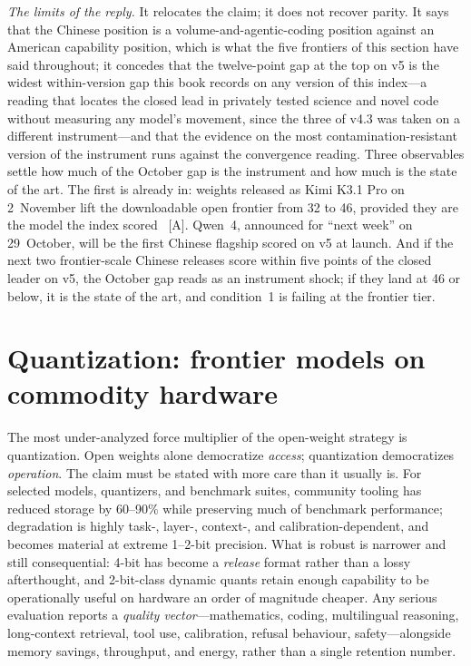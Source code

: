 \emph{The limits of the reply.} It relocates the claim; it does not recover parity. It says that the Chinese position is a volume-and-agentic-coding position against an American capability position, which is what the five frontiers of this section have said throughout; it concedes that the twelve-point gap at the top on v5 is the widest within-version gap this book records on any version of this index---a reading that locates the closed lead in privately tested science and novel code without measuring any model's movement, since the three of v4.3 was taken on a different instrument---and that the evidence on the most contamination-resistant version of the instrument runs against the convergence reading. Three observables settle how much of the October gap is the instrument and how much is the state of the art. The first is already in: weights released as Kimi K3.1 Pro on 2~November lift the downloadable open frontier from 32 to 46, provided they are the model the index scored~\cite{lit-k31-weights} [A]. Qwen~4, announced for ``next week'' on 29~October, will be the first Chinese flagship scored on v5 at launch. And if the next two frontier-scale Chinese releases score within five points of the closed leader on v5, the October gap reads as an instrument shock; if they land at 46 or below, it is the state of the art, and condition~1 is failing at the frontier tier.

\section{Quantization: frontier models on commodity hardware}
\label{sec:quant}

The most under-analyzed force multiplier of the open-weight strategy is quantization. Open weights alone democratize \emph{access}; quantization democratizes \emph{operation}. The claim must be stated with more care than it usually is. For selected models, quantizers, and benchmark suites, community tooling has reduced storage by 60--90\% while preserving much of benchmark performance; degradation is highly task-, layer-, context-, and calibration-dependent, and becomes material at extreme 1--2-bit precision. What is robust is narrower and still consequential: 4-bit has become a \emph{release} format rather than a lossy afterthought, and 2-bit-class dynamic quants retain enough capability to be operationally useful on hardware an order of magnitude cheaper. Any serious evaluation reports a \emph{quality vector}---mathematics, coding, multilingual reasoning, long-context retrieval, tool use, calibration, refusal behaviour, safety---alongside memory savings, throughput, and energy, rather than a single retention number.

